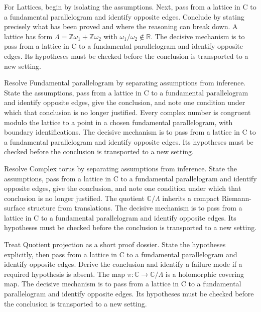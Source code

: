 \begin{example}\label{ex:iv27-worked-01}
For Lattices, begin by isolating the assumptions. Next, pass from a lattice in C to a fundamental parallelogram and identify opposite edges. Conclude by stating precisely what has been proved and where the reasoning can break down. A lattice has form $\Lambda=\mathbb Z\omega_1+\mathbb Z\omega_2$ with $\omega_1/\omega_2\notin\mathbb R$. The decisive mechanism is to pass from a lattice in C to a fundamental parallelogram and identify opposite edges. Its hypotheses must be checked before the conclusion is transported to a new setting.
\end{example}

\begin{example}\label{ex:iv27-worked-02}
Resolve Fundamental parallelogram by separating assumptions from inference. State the assumptions, pass from a lattice in C to a fundamental parallelogram and identify opposite edges, give the conclusion, and note one condition under which that conclusion is no longer justified. Every complex number is congruent modulo the lattice to a point in a chosen fundamental parallelogram, with boundary identifications. The decisive mechanism is to pass from a lattice in C to a fundamental parallelogram and identify opposite edges. Its hypotheses must be checked before the conclusion is transported to a new setting.
\end{example}

\begin{example}\label{ex:iv27-worked-03}
Resolve Complex torus by separating assumptions from inference. State the assumptions, pass from a lattice in C to a fundamental parallelogram and identify opposite edges, give the conclusion, and note one condition under which that conclusion is no longer justified. The quotient $\mathbb C/\Lambda$ inherits a compact Riemann-surface structure from translations. The decisive mechanism is to pass from a lattice in C to a fundamental parallelogram and identify opposite edges. Its hypotheses must be checked before the conclusion is transported to a new setting.
\end{example}

\begin{example}\label{ex:iv27-worked-04}
Treat Quotient projection as a short proof dossier. State the hypotheses explicitly, then pass from a lattice in C to a fundamental parallelogram and identify opposite edges. Derive the conclusion and identify a failure mode if a required hypothesis is absent. The map $\pi:\mathbb C\to\mathbb C/\Lambda$ is a holomorphic covering map. The decisive mechanism is to pass from a lattice in C to a fundamental parallelogram and identify opposite edges. Its hypotheses must be checked before the conclusion is transported to a new setting.
\end{example}


